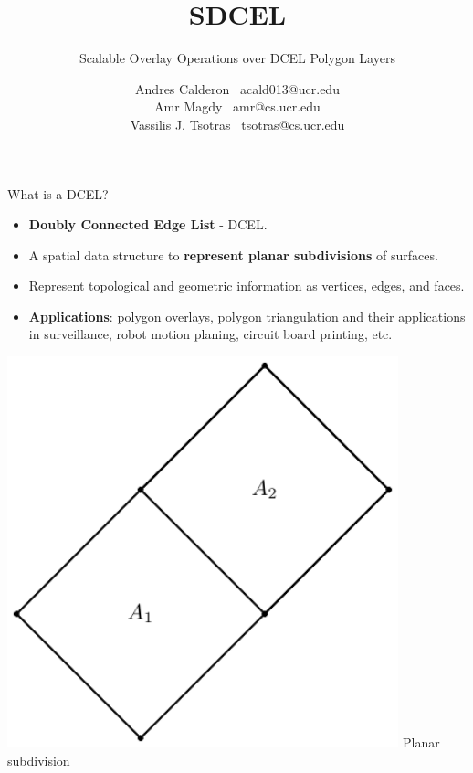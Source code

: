 \documentclass{beamer}
\title{SDCEL}
\subtitle{Scalable Overlay Operations over DCEL Polygon Layers}
\author{
    Andres Calderon \textperiodcentered \ acald013@ucr.edu \\
    Amr Magdy \textperiodcentered \ amr@cs.ucr.edu \\ 
    Vassilis J. Tsotras \textperiodcentered \ tsotras@cs.ucr.edu
}
\institute{University of California, Riverside}
\begin{document}
    \begin{frame}
        \maketitle
    \end{frame}

    \begin{frame}{What is a DCEL?}
        \begin{minipage}{0.65\textwidth}
        \begin{itemize}
            \item \textbf{Doubly Connected Edge List} - DCEL.
            \item A spatial data structure to \textbf{represent planar subdivisions} of surfaces.
            \item Represent topological and geometric information as vertices, edges, and faces.
            \item \textbf{Applications}: polygon overlays, polygon triangulation and their applications in surveillance, robot motion planing, circuit board printing, etc.
        \end{itemize}
        \end{minipage}\hfill %
        \begin{minipage}{0.34\textwidth}
            \centering
            \includegraphics[width=0.85\textwidth]{figures/planar_subdivision}
            \tiny{Planar subdivision} \\

\end{minipage}
\end{frame}
\end{document}
